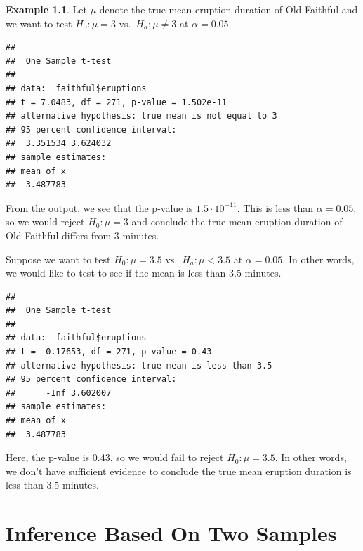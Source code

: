 \documentclass[
  11pt,
  oneside]{book}
\newenvironment{Shaded}{\begin{snugshade}}{\end{snugshade}}
\newcommand{\AttributeTok}[1]{\textcolor[rgb]{0.13,0.29,0.53}{#1}}
\newcommand{\DecValTok}[1]{\textcolor[rgb]{0.00,0.00,0.81}{#1}}
\newcommand{\FloatTok}[1]{\textcolor[rgb]{0.00,0.00,0.81}{#1}}
\newcommand{\FunctionTok}[1]{\textcolor[rgb]{0.13,0.29,0.53}{\textbf{#1}}}
\newcommand{\NormalTok}[1]{#1}
\newcommand{\SpecialCharTok}[1]{\textcolor[rgb]{0.81,0.36,0.00}{\textbf{#1}}}
\newcommand{\StringTok}[1]{\textcolor[rgb]{0.31,0.60,0.02}{#1}}
\theoremstyle{definition}
\theoremstyle{definition}
\newtheorem{example}{Example}[chapter]
\theoremstyle{definition}
\theoremstyle{definition}
\theoremstyle{remark}
\begin{document}
\begin{example}
Let \(\mu\) denote the true mean eruption duration of Old Faithful and we want to test \(H_0: \mu = 3\) vs.~\(H_a: \mu \neq 3\) at \(\alpha = 0.05\).

\begin{Shaded}
\end{Shaded}

\begin{verbatim}
## 
##  One Sample t-test
## 
## data:  faithful$eruptions
## t = 7.0483, df = 271, p-value = 1.502e-11
## alternative hypothesis: true mean is not equal to 3
## 95 percent confidence interval:
##  3.351534 3.624032
## sample estimates:
## mean of x 
##  3.487783
\end{verbatim}

From the output, we see that the p-value is \(1.5 \cdot 10^{-11}\). This is less than \(\alpha=0.05\), so we would reject \(H_0: \mu = 3\) and conclude the true mean eruption duration of Old Faithful differs from 3 minutes.

Suppose we want to test \(H_0: \mu = 3.5\) vs.~\(H_a: \mu < 3.5\) at \(\alpha=0.05\). In other words, we would like to test to see if the mean is less than 3.5 minutes.

\begin{Shaded}
\end{Shaded}

\begin{verbatim}
## 
##  One Sample t-test
## 
## data:  faithful$eruptions
## t = -0.17653, df = 271, p-value = 0.43
## alternative hypothesis: true mean is less than 3.5
## 95 percent confidence interval:
##      -Inf 3.602007
## sample estimates:
## mean of x 
##  3.487783
\end{verbatim}

Here, the p-value is 0.43, so we would fail to reject \(H_0: \mu = 3.5\). In other words, we don't have sufficient evidence to conclude the true mean eruption duration is less than 3.5 minutes.

\chapter{Inference Based On Two Samples}\label{inference-based-on-two-samples}


\end{example}
\end{document}
